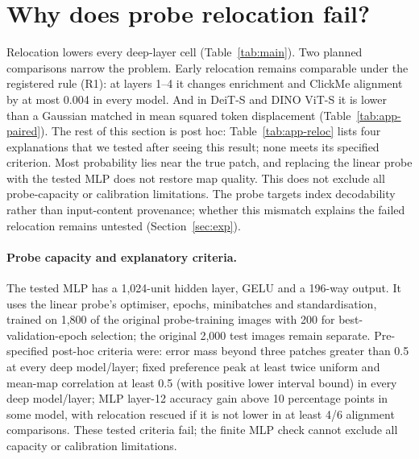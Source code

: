 \begin{table}[!htbp]
\caption{Stored model-randomisation results: median map correlation after full randomisation. The five readings pass the registered $<0.5$ criterion in every model.}
\label{tab:sanity}
\centering\small

\end{table}


\clearpage
\section{Why does probe relocation fail?}
\label{app:reloc}

Relocation lowers every deep-layer cell (Table~\ref{tab:main}). Two planned comparisons narrow the problem. Early relocation remains comparable under the registered rule (R1): at layers 1--4 it changes enrichment and ClickMe alignment by at most 0.004 in every model. And in DeiT-S and DINO ViT-S it is lower than a Gaussian matched in mean squared token displacement (Table~\ref{tab:app-paired}). The rest of this section is post hoc: Table~\ref{tab:app-reloc} lists four explanations that we tested after seeing this result; none meets its specified criterion. Most probability lies near the true patch, and replacing the linear probe with the tested MLP does not restore map quality. This does not exclude all probe-capacity or calibration limitations. The probe targets index decodability rather than input-content provenance; whether this mismatch explains the failed relocation remains untested (Section~\ref{sec:exp}).

\begin{table}[!htbp]
\caption{Four explanations for probe-relocation failure (post hoc). Model order: DeiT-S, DeiT-B, DINO ViT-S. Cells are the two centre-controlled metrics in the three models; criteria and probe settings are defined in this section.}
\label{tab:app-reloc}
\centering

\end{table}

\paragraph{Probe capacity and explanatory criteria.} The tested MLP has a 1,024-unit hidden layer, GELU and a 196-way output. It uses the linear probe's optimiser, epochs, minibatches and standardisation, trained on 1,800 of the original probe-training images with 200 for best-validation-epoch selection; the original 2,000 test images remain separate. Pre-specified post-hoc criteria were: error mass beyond three patches greater than 0.5 at every deep model/layer; fixed preference peak at least twice uniform and mean-map correlation at least 0.5 (with positive lower interval bound) in every deep model/layer; MLP layer-12 accuracy gain above 10 percentage points in some model, with relocation rescued if it is not lower in at least 4/6 alignment comparisons. These tested criteria fail; the finite MLP check cannot exclude all capacity or calibration limitations.

